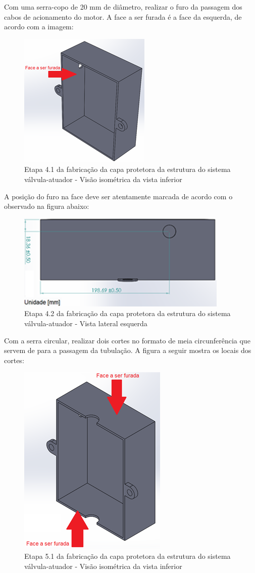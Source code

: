 Com uma serra-copo de 20 mm de diâmetro, realizar o furo da passagem dos cabos de acionamento do motor. A face a ser furada é a face da esquerda, de acordo com a imagem:
\begin{figure} [H]
    \centering
    \includegraphics[width=.4\textwidth]{Figuras/montagemAbastecimento/capa/etapa4_1.png}
    \caption{Etapa 4.1 da fabricação da capa protetora da estrutura do sistema válvula-atuador - Visão isométrica da vista inferior}
    \label{fig:etapa4.1}
\end{figure}

A posição do furo na face deve ser atentamente marcada de acordo com o observado na figura abaixo:
\begin{figure} [H]
    \centering
    \includegraphics[width=.5\textwidth]{Figuras/montagemAbastecimento/capa/etapa4_2.png}
    \caption{Etapa 4.2 da fabricação da capa protetora da estrutura do sistema válvula-atuador - Vista lateral esquerda}
    \label{fig:etapa4.1}
\end{figure}

Com a serra circular, realizar dois cortes no formato de meia circunferência que servem de para a passagem da tubulação. A figura a seguir mostra os locais dos cortes:
\begin{figure} [H]
    \centering
    \includegraphics[width=.4\textwidth]{Figuras/montagemAbastecimento/capa/etapa5_1.png}
    \caption{Etapa 5.1 da fabricação da capa protetora da estrutura do sistema válvula-atuador - Visão isométrica da vista inferior}
    \label{fig:etapa5.1}
\end{figure}

